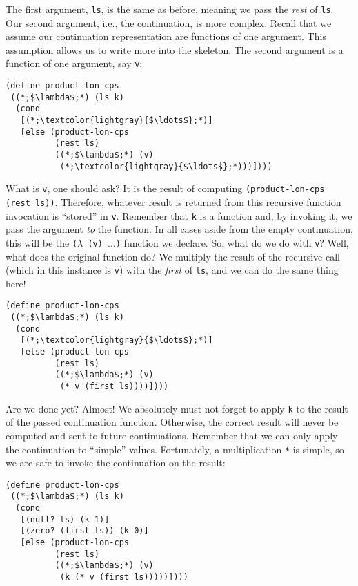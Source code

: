 The first argument, \texttt{ls}, is the same as before, meaning we pass the \textit{rest} of \texttt{ls}. Our second argument, i.e., the continuation, is more complex. Recall that we assume our continuation representation are functions of one argument. This assumption allows us to write more into the skeleton. The second argument is a function of one argument, say \texttt{v}:
\begin{cl}[]{}\begin{lstlisting}[language=MyScheme]
(define product-lon-cps
 ((*;$\lambda$;*) (ls k)
  (cond
   [(*;\textcolor{lightgray}{$\ldots$};*)]
   [else (product-lon-cps 
          (rest ls) 
          ((*;$\lambda$;*) (v) 
           (*;\textcolor{lightgray}{$\ldots$};*)))])))
\end{lstlisting}\end{cl}
What is \texttt{v}, one should ask? It is the result of computing \texttt{(product-lon-cps (rest ls))}. Therefore, whatever result is returned from this recursive function invocation is ``stored'' in \texttt{v}. Remember that \texttt{k} is a function and, by invoking it, we pass the argument \textit{to} the function. In all cases aside from the empty continuation, this will be the \texttt{($\lambda$ (v) $\ldots$)} function we declare. So, what do we do with \texttt{v}? Well, what does the original function do? We multiply the result of the recursive call (which in this instance is \texttt{v}) with the \textit{first} of \texttt{ls}, and we can do the same thing here!
\begin{cl}[]{}\begin{lstlisting}[language=MyScheme]
(define product-lon-cps
 ((*;$\lambda$;*) (ls k)
  (cond
   [(*;\textcolor{lightgray}{$\ldots$};*)]
   [else (product-lon-cps 
          (rest ls) 
          ((*;$\lambda$;*) (v) 
           (* v (first ls))))])))
\end{lstlisting}\end{cl}
Are we done yet? Almost! We absolutely must not forget to apply \texttt{k} to the result of the passed continuation function. Otherwise, the correct result will never be computed and sent to future continuations. Remember that we can only apply the continuation to ``simple'' values. Fortunately, a multiplication \texttt{*} is simple, so we are safe to invoke the continuation on the result:
\begin{cl}[]{}\begin{lstlisting}[language=MyScheme]
(define product-lon-cps
 ((*;$\lambda$;*) (ls k)
  (cond
   [(null? ls) (k 1)]
   [(zero? (first ls)) (k 0)]
   [else (product-lon-cps 
          (rest ls) 
          ((*;$\lambda$;*) (v) 
           (k (* v (first ls)))))])))
\end{lstlisting}\end{cl}
